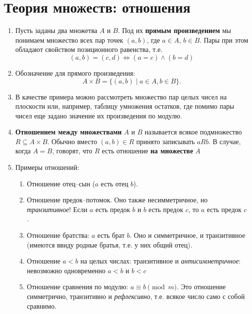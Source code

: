 \section{Теория множеств: отношения}\label{Rels}




\begin{enumerate}
\item Пусть заданы два множетва $A$ и $B$. Под их \textbf{прямым произведением} мы понимаем множество всех пар точек $(a,b)$, где $a\in A$, $b\in B$. Пары при этом обладают свойством позиционного равенства, т.е.
$$
(a,b)=(c,d) \iff (a=c)\land (b=d)
$$
\item Обозначение для прямого произведения:
$$
A\times B = \{(a,b)\mid a\in A, b\in B\}.
$$
\item В качестве примера можно рассмотреть множество пар целых чисел на плоскости или, например, таблицу умножения остатков, где помимо пары чисел еще задано значение их произведения по модулю.
\item \textbf{Отношением между множествами} $A$ и $B$ называется всякое подмножество $R\subseteq A\times B$. Обычно вместо $(a,b)\in R$ принято записывать $aRb$. В случае, когда $A=B$, говорят, что $R$ есть отношение \textbf{на множестве} $A$
\item Примеры отношений:
\begin{enumerate}[\bf R1]
\item Отношение отец--сын ($a$ есть отец $b$).
\item Отношение предок--потомок. Оно также несимметричное, но \textit{транзитивное}! Если $a$ есть предок $b$ и $b$ есть предок $c$, то $a$ есть предок $c$.
\item Отношение братства: $a$ есть брат $b$. Оно и симметричное, и транзитивное (имеются ввиду родные братья, т.е. у них общий отец).
\item Отношение $a<b$ на целых числах: транзитивное и \textit{антисимметричное}: невозможно одновременно $a<b$ и $b<c$
\item Отношение сравнения по модулю: $a\equiv b\pmod m$. Это отношение симметрично, транзитивно и \textit{рефлексивно}, т.е. всякое число само с собой сравнимо.
\end{enumerate}

\end{enumerate}
